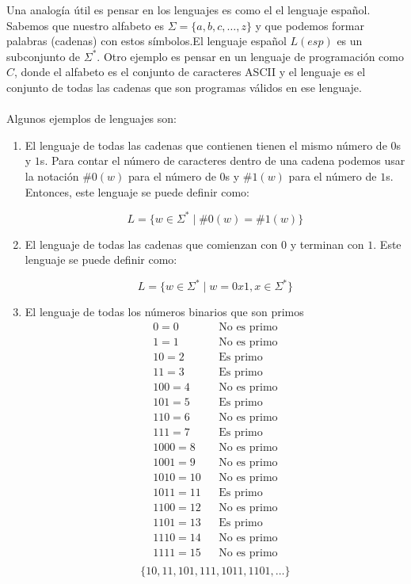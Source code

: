 Una analogía útil es pensar en los lenguajes es como el el lenguaje español. Sabemos que nuestro
alfabeto es $\Sigma = \{a, b, c, \ldots, z\}$ y que podemos formar palabras (cadenas) con estos símbolos.El 
lenguaje español $L(esp)$ es un subconjunto de $\Sigma^*$. Otro ejemplo es pensar en un lenguaje de programación como $C$, donde el alfabeto es el conjunto de caracteres ASCII y 
el lenguaje es el conjunto de todas las cadenas que son programas válidos en ese lenguaje.
\\ \\ 
Algunos ejemplos de lenguajes son:

\begin{enumerate}
    \item El lenguaje de todas las cadenas que contienen tienen el mismo número de $0$s y $1$s. Para contar el número de caracteres dentro 
    de una cadena podemos usar la notación $\#0(w)$ para el número de $0$s y $\#1(w)$ para el número de $1$s. Entonces, este lenguaje se puede definir como:

    $$L = \{w \in \Sigma^* \mid \#0(w) = \#1(w)\}$$

    \item El lenguaje de todas las cadenas que comienzan con $0$ y terminan con $1$. Este lenguaje se puede definir como:

    $$L = \{w \in \Sigma^* \mid w = 0x1, x \in \Sigma^*\}$$

    \item El lenguaje de todas los números binarios que son primos 
    \begin{align*}
        0  = 0 && \text{No es primo} \\ 
        1  = 1 && \text{No es primo} \\ 
        10 = 2 && \text{Es primo} \\ 
        11 = 3 && \text{Es primo} \\ 
        100 = 4 && \text{No es primo} \\ 
        101 = 5 && \text{Es primo} \\ 
        110 = 6 && \text{No es primo} \\ 
        111 = 7 && \text{Es primo} \\ 
        1000 = 8 && \text{No es primo} \\ 
        1001 = 9 && \text{No es primo} \\ 
        1010 = 10 && \text{No es primo} \\ 
        1011 = 11 && \text{Es primo} \\ 
        1100 = 12 && \text{No es primo} \\ 
        1101 = 13 && \text{Es primo} \\ 
        1110 = 14 && \text{No es primo} \\ 
        1111 = 15 && \text{No es primo} \\ 
    \end{align*}
    $$\{10, 11, 101, 111, 1011, 1101, \dots\}$$


\end{enumerate}
